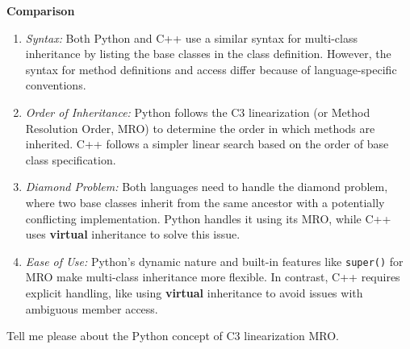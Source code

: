 \begin{airesult}
\vsp

\textbf{Comparison}

\vsp

\begin{enumerate}
  \item \textit{Syntax:} Both Python and C++ use a similar syntax for
multi-class inheritance by listing the base classes in the class definition.
However, the syntax for method definitions and access differ because of
language-specific conventions.

  \item \textit{Order of Inheritance:} Python follows the C3 linearization (or
Method Resolution Order, MRO) to determine the order in which methods are
inherited. C++ follows a simpler linear search based on the order of base class
specification.

  \item \textit{Diamond Problem:} Both languages need to handle the diamond
problem, where two base classes inherit from the same ancestor with a
potentially conflicting implementation. Python handles it using its MRO, while
C++ uses \textbf{virtual} inheritance to solve this issue.

  \item \textit{Ease of Use:} Python's dynamic nature and built-in features like
\verb|super()| for MRO make multi-class inheritance more flexible. In contrast,
C++ requires explicit handling, like using \textbf{virtual} inheritance to avoid
issues with ambiguous member access.
\end{enumerate}
\end{airesult}


\begin{ai}
Tell me please about the Python concept of C3 linearization MRO.
\end{ai}

